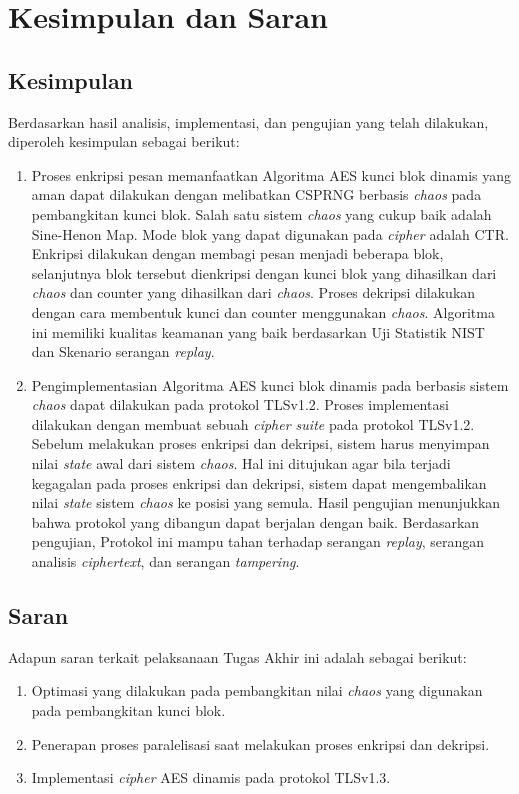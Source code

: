 \chapter{Kesimpulan dan Saran}

\section{Kesimpulan}
Berdasarkan hasil analisis, implementasi, dan pengujian yang telah dilakukan, diperoleh kesimpulan sebagai berikut:
\begin{enumerate}
  \item Proses enkripsi pesan memanfaatkan Algoritma AES kunci blok dinamis yang aman dapat dilakukan dengan melibatkan CSPRNG berbasis \emph{chaos} pada pembangkitan kunci blok. Salah satu sistem \emph{chaos} yang cukup baik adalah Sine-Henon Map. Mode blok yang dapat digunakan pada \emph{cipher} adalah CTR. Enkripsi dilakukan dengan membagi pesan menjadi beberapa blok, selanjutnya blok tersebut dienkripsi dengan kunci blok yang dihasilkan dari \emph{chaos} dan counter yang dihasilkan dari \emph{chaos}. Proses dekripsi dilakukan dengan cara membentuk kunci dan counter menggunakan \emph{chaos}. Algoritma ini memiliki kualitas keamanan yang baik berdasarkan Uji Statistik NIST dan Skenario serangan \emph{replay}.
  \item Pengimplementasian Algoritma AES kunci blok dinamis pada berbasis sistem \emph{chaos} dapat dilakukan pada protokol TLSv1.2. Proses implementasi dilakukan dengan membuat sebuah \emph{cipher suite} pada protokol TLSv1.2. Sebelum melakukan proses enkripsi dan dekripsi, sistem harus menyimpan nilai \emph{state} awal dari sistem \emph{chaos}. Hal ini ditujukan agar bila terjadi kegagalan pada proses enkripsi dan dekripsi, sistem dapat mengembalikan nilai \emph{state} sistem \emph{chaos} ke posisi yang semula. Hasil pengujian menunjukkan bahwa protokol yang dibangun dapat berjalan dengan baik. Berdasarkan pengujian, Protokol ini mampu tahan terhadap serangan \emph{replay}, serangan analisis \emph{ciphertext}, dan serangan \emph{tampering}.
\end{enumerate}

\section{Saran}
Adapun saran terkait pelaksanaan Tugas Akhir ini adalah sebagai berikut:
\begin{enumerate}
  \item Optimasi yang dilakukan pada pembangkitan nilai \emph{chaos} yang digunakan pada pembangkitan kunci blok.
  \item Penerapan proses paralelisasi saat melakukan proses enkripsi dan dekripsi.
  \item Implementasi \emph{cipher} AES dinamis pada protokol TLSv1.3. 
\end{enumerate}